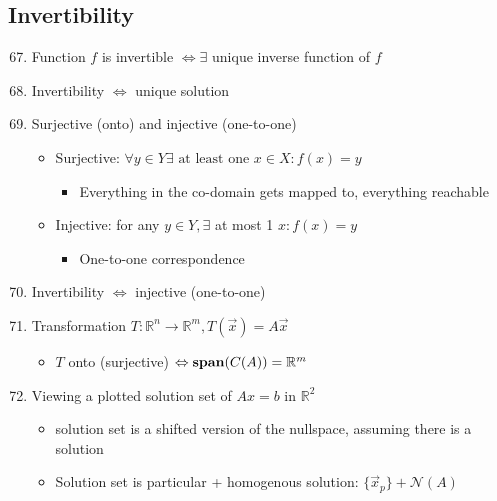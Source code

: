 \documentclass[10pt,letterpaper]{article}
\begin{document}
\subsection{Invertibility}
\label{sec-1_5}

\begin{enumerate}
\setcounter{enumi}{66}
\item  Function $f$ is invertible $\Leftrightarrow \exists$ unique inverse function of $f$
\item Invertibility $\Leftrightarrow$ unique solution
\item Surjective (onto) and injective (one-to-one)

\begin{itemize}
\item Surjective: $\forall y \in Y \exists \text{ at least one } x \in X: f(x)=y$

\begin{itemize}
\item Everything in the co-domain gets mapped to, everything reachable
\end{itemize}

\item Injective: for any $y \in Y, \exists$ at most 1 $x: f(x)=y$

\begin{itemize}
\item One-to-one correspondence
\end{itemize}

\end{itemize}

\item Invertibility $\Leftrightarrow$ injective (one-to-one)
\item Transformation $T: \mathbb{R}^{n} \rightarrow \mathbb{R}^{m}, T( \vec{x})= A \vec{x}$

\begin{itemize}
\item $T$ onto (surjective) $\Leftrightarrow {\bf span} (C(A))= \mathbb{R}^{m}$
\end{itemize}

\item Viewing a plotted solution set of $Ax=b$ in $\mathbb{R}^{2}$

\begin{itemize}
\item solution set is a shifted version of the nullspace, assuming there is a solution
\item Solution set is particular + homogenous solution: $\{ \vec{x} _p\} + \mathcal{N}(A)$
\end{itemize}


\end{enumerate}
\end{document}
